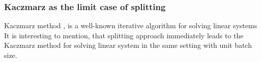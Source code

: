 \documentclass{article}
\begin{document}



\subsubsection{Kaczmarz as the limit case of splitting}
Kaczmarz method \cite{kaczmarz1937method}, \cite{strohmer2009randomized} is a well-known iterative algorithm for solving linear systems
It is interesting to mention, that splitting approach immediately leads to the Kaczmarz method for solving linear system in the same setting with unit batch size.
\end{document}
